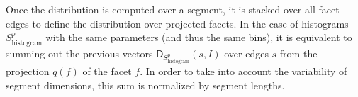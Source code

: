         \begin{figure}[htpb]
            \begin{center}
            \end{center}
        \end{figure}

        Once the distribution is computed over a segment, it is stacked over all facet edges to define the distribution over projected facets.
        In the case of histograms $S^p_{\text{histogram}}$ with the same parameters (and thus the same bins), it is equivalent to summing out the previous vectors $\mathsf{D}_{S^p_{\text{histogram}}}(s, I)$ over edges $s$ from the projection $q\left(f\right)$ of the facet $f$.
        In order to take into account the variability of segment dimensions, this sum is normalized by segment lengths.


